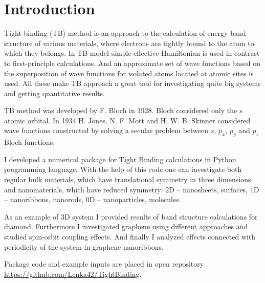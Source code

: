 \chapter{Introduction}
\label{ch:introduction}
Tight-binding (TB) method is an approach to the calculation of energy band structure of various materials, where electrons are tightly bound to the atom to which they belongs. In TB model simple effective Hamiltonian is used in contrast to first-principle calculations. And an approximate set of wave functions based on the superposition of wave functions for isolated atoms located at atomic sites is used. All these make TB approach a great tool for investigating quite big systems and getting quantitative results.

TB method was developed by F. Bloch \cite{bloch} in 1928. Bloch considered only the $s$ atomic orbital. In 1934 H. Jones, N. F. Mott and H. W. B. Skinner \cite{mott} considered wave functions constructed by solving a secular problem between $s$, $p_x$, $p_y$ and $p_z$ Bloch functions.

I developed a numerical package for Tight Binding calculations in Python programming language. With the help of this code one can investigate both regular bulk materials, which have translational symmetry in three dimensions and nanomaterials, which have reduced symmetry: $2$D -- nanosheets, surfaces, $1$D -- nanoribbons, nanorods, $0$D -- nanoparticles, molecules.

As an example of 3D system I provided results of band structure calculations for diamond. Furthermore I investigated graphene using different approaches and studied spin-orbit coupling effects. And finally I analyzed effects connected with periodicity of the system in graphene nanoribbons.

Package code and example inputs are placed in open repository \url{https://github.com/Lenka42/TightBinding}.